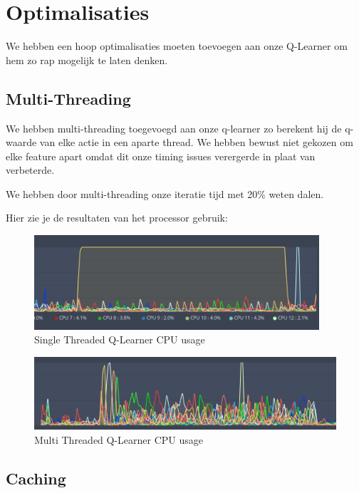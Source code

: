 \documentclass[a4paper,openany]{uantwerpenassignment}
\begin{document}
\chapter{Optimalisaties}

We hebben een hoop optimalisaties moeten toevoegen aan onze Q-Learner om hem zo rap mogelijk te laten denken.

\section{Multi-Threading}

We hebben multi-threading toegevoegd aan onze q-learner zo berekent hij de q-waarde van elke actie in een aparte thread. We hebben bewust niet gekozen om elke feature apart omdat dit onze timing issues verergerde in plaat van verbeterde.

We hebben door multi-threading onze iteratie tijd met 20\% weten dalen.

Hier zie je de resultaten van het processor gebruik:

\begin{figure}[h]
    \centering
    \includegraphics[width=300pt]{images/singlethreaded.png}
    \caption{Single Threaded Q-Learner CPU usage}
    \label{fig:singlethreaded}
\end{figure}

\begin{figure}[h]
    \centering
    \includegraphics[width=350pt]{images/multithreaded.png}
    \caption{Multi Threaded Q-Learner CPU usage}
    \label{fig:multithreaded}
\end{figure}

\section{Caching}
\end{document}
